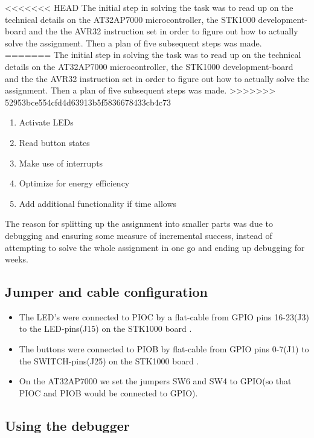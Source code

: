 <<<<<<< HEAD
The initial step in solving the task was to read up on the technical details on the AT32AP7000 \cite{ap7000} microcontroller, the STK1000 development-board and the the AVR32 instruction set \cite[Section 9]{avr32} in order to figure out how to actually solve the assignment. Then a plan of five subsequent steps was made.
=======
The initial step in solving the task was to read up on the technical details on the AT32AP7000 \cite{ap7000} microcontroller, the STK1000 development-board and the the AVR32 instruction set \cite{avr32} in order to figure out how to actually solve the assignment. Then a plan of five subsequent steps was made.
>>>>>>> 52953bce554cfd4d63913b5f5836678433cb4c73

\begin{enumerate}
\item Activate LEDs
\item Read button states
\item Make use of interrupts
\item Optimize for energy efficiency
\item Add additional functionality if time allows
\end{enumerate}

The reason for splitting up the assignment into smaller parts was due to debugging and ensuring some measure of incremental success, instead of attempting to solve the whole assignment in one go and ending up debugging for weeks.
\subsection{Jumper and cable configuration}


\begin{itemize}
\item The LED’s were connected to PIOC by a flat-cable from GPIO pins 16-23(J3) to the LED-pins(J15) on the STK1000 board \cite[section~2.4.1]{compendium}. 
\item The buttons were connected to PIOB by flat-cable from GPIO pins 0-7(J1) to the SWITCH-pins(J25) on the STK1000 board \cite[section~2.4.1]{compendium}.
\item On the AT32AP7000 we set the jumpers SW6 and SW4 to GPIO(so that PIOC and PIOB would be connected to GPIO)\cite[table~2.3]{compendium}.
\end{itemize}

\subsection{Using the debugger}

